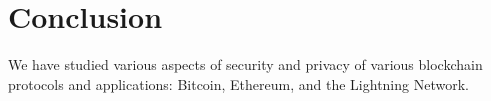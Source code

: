 \chapter{Conclusion}

\label{Chapter13Conclusion}

We have studied various aspects of security and privacy of various blockchain protocols and applications: Bitcoin, Ethereum, and the Lightning Network.

